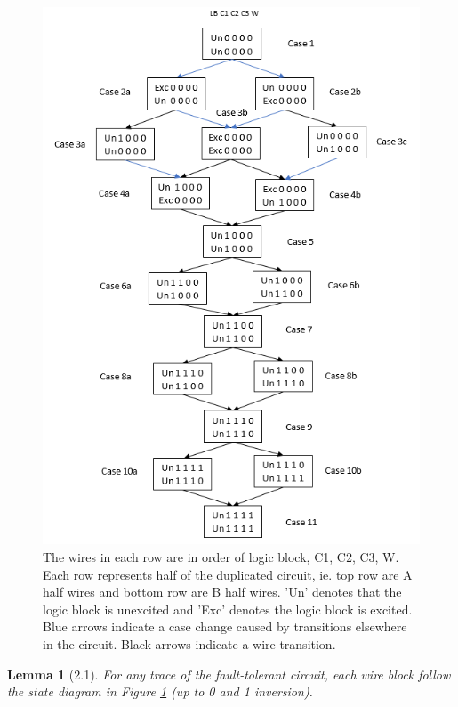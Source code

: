 \documentclass[12pt]{report}
\newtheorem*{lemma}{Lemma}
\begin{document}
\begin{figure}
  \centering
    \includegraphics{flowl2c3}
  \caption[Lemma 2 transitions]{The wires in each row are in order of logic block, C1, C2, C3, W.  Each row represents half of the duplicated circuit, ie. top row are A half wires and bottom row are B half wires.  'Un' denotes that the logic block is unexcited and 'Exc' denotes the logic block is excited.  Blue arrows indicate a case change caused by transitions elsewhere in the circuit.  Black arrows indicate a wire transition.}
  \label{fig:l21}
\end{figure}
\begin{lemma}[2.1]
For any trace of the fault-tolerant circuit, each wire block follow the state diagram in Figure \ref{fig:l21} (up to 0 and 1 inversion).
\end{lemma}
\end{document}
